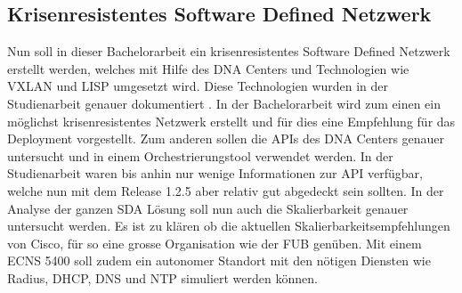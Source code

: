 \subsection{Krisenresistentes Software Defined Netzwerk}
Nun soll in dieser Bachelorarbeit ein krisenresistentes Software Defined Netzwerk erstellt werden, welches mit Hilfe des DNA Centers und Technologien wie VXLAN und LISP umgesetzt wird. Diese Technologien wurden in der Studienarbeit genauer dokumentiert \cite{studienarbeit}. In der Bachelorarbeit wird zum einen ein möglichst krisenresistentes Netzwerk erstellt und für dies eine Empfehlung für das Deployment vorgestellt. Zum anderen sollen die APIs des DNA Centers genauer untersucht und in einem Orchestrierungstool verwendet werden. In der Studienarbeit waren bis anhin nur wenige Informationen zur API verfügbar, welche nun mit dem Release 1.2.5 aber relativ gut abgedeckt sein sollten. In der Analyse der ganzen SDA Lösung soll nun auch die Skalierbarkeit genauer untersucht werden. Es ist zu klären ob die aktuellen Skalierbarkeitsempfehlungen von Cisco, für so eine grosse Organisation wie der FUB genüben. Mit einem ECNS 5400 soll zudem ein autonomer Standort mit den nötigen Diensten wie Radius, DHCP, DNS und NTP simuliert werden können.





